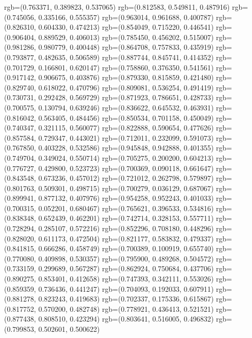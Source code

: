 {{{					rgb=(0.763371, 0.389823, 0.537065)
					rgb=(0.812583, 0.549811, 0.487916)
					rgb=(0.745056, 0.335166, 0.555357)
					rgb=(0.963014, 0.961688, 0.400787)
					rgb=(0.826310, 0.604330, 0.474213)
					rgb=(0.854049, 0.715220, 0.446541)
					rgb=(0.906404, 0.889529, 0.406013)
					rgb=(0.785450, 0.456202, 0.515007)
					rgb=(0.981286, 0.980779, 0.400448)
					rgb=(0.864708, 0.757833, 0.435919)
					rgb=(0.793877, 0.482635, 0.506589)
					rgb=(0.887744, 0.845741, 0.414352)
					rgb=(0.701729, 0.166801, 0.620147)
					rgb=(0.758860, 0.376350, 0.541561)
					rgb=(0.917142, 0.906675, 0.403876)
					rgb=(0.879330, 0.815859, 0.421480)
					rgb=(0.829740, 0.618022, 0.470796)
					rgb=(0.809081, 0.536254, 0.491419)
					rgb=(0.730731, 0.292428, 0.569729)
					rgb=(0.871923, 0.786651, 0.428733)
					rgb=(0.700575, 0.130794, 0.639246)
					rgb=(0.836622, 0.645532, 0.463931)
					rgb=(0.816042, 0.563405, 0.484456)
					rgb=(0.850534, 0.701158, 0.450049)
					rgb=(0.740347, 0.321115, 0.560077)
					rgb=(0.822888, 0.590654, 0.477626)
					rgb=(0.857584, 0.729347, 0.443021)
					rgb=(0.712011, 0.232099, 0.591073)
					rgb=(0.767850, 0.403228, 0.532586)
					rgb=(0.945848, 0.942888, 0.401355)
					rgb=(0.749704, 0.349024, 0.550714)
					rgb=(0.705275, 0.200200, 0.604213)
					rgb=(0.776727, 0.429800, 0.523723)
					rgb=(0.700369, 0.090118, 0.661647)
					rgb=(0.843548, 0.673236, 0.457012)
					rgb=(0.721012, 0.262798, 0.579897)
					rgb=(0.801763, 0.509301, 0.498715)
					rgb=(0.700279, 0.036129, 0.687067)
					rgb=(0.899941, 0.877132, 0.407976)
					rgb=(0.954258, 0.952243, 0.401033)
					rgb=(0.700315, 0.052201, 0.680467)
					rgb=(0.765621, 0.396533, 0.534816)
					rgb=(0.838348, 0.652439, 0.462201)
					rgb=(0.742714, 0.328153, 0.557711)
					rgb=(0.728294, 0.285107, 0.572216)
					rgb=(0.852296, 0.708180, 0.448296)
					rgb=(0.828020, 0.611173, 0.472504)
					rgb=(0.821177, 0.583832, 0.479337)
					rgb=(0.841815, 0.666286, 0.458749)
					rgb=(0.700389, 0.100919, 0.655740)
					rgb=(0.770080, 0.409898, 0.530357)
					rgb=(0.795900, 0.489268, 0.504572)
					rgb=(0.733159, 0.299689, 0.567287)
					rgb=(0.862924, 0.750684, 0.437706)
					rgb=(0.890275, 0.853401, 0.412658)
					rgb=(0.747393, 0.342111, 0.553026)
					rgb=(0.859359, 0.736436, 0.441247)
					rgb=(0.704093, 0.192033, 0.607911)
					rgb=(0.881278, 0.823243, 0.419683)
					rgb=(0.702337, 0.175336, 0.615867)
					rgb=(0.817752, 0.570200, 0.482748)
					rgb=(0.778921, 0.436413, 0.521521)
					rgb=(0.877438, 0.808510, 0.423294)
					rgb=(0.803641, 0.516005, 0.496832)
					rgb=(0.799853, 0.502601, 0.500622)
}}}
